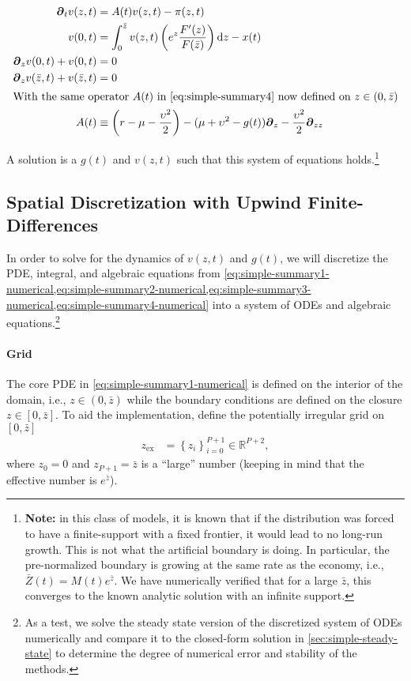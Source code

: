 \documentclass[11pt]{article}
\newcommand{\D}[1][]{\ensuremath{\boldsymbol{\partial}_{#1}}}
\newcommand{\R}{\ensuremath{\mathbb{R}}}
\newcommand{\diff}{\ensuremath{\mathrm{d}}}
\newcommand{\ex}{\ensuremath{\mathrm{ex}}}
\newcommand{\set}[1]{\ensuremath{\left\{{#1}\right\}}}
\begin{document}
\begin{align}
\D[t]v(z,t) &= A(t)v(z,t) - \pi(z,t)\label{eq:simple-summary1-numerical}\\
v(0,t) &= \int_{0}^{\bar{z}}  v(z,t) \left(e^z \frac{F'(z)}{F(\bar{z})}\right) \diff z - x(t)\label{eq:simple-summary2-numerical}\\
\D[z]v(0,t) + v(0,t) &= 0\label{eq:simple-summary3-numerical}\\
\D[z]v(\bar{z},t) + v(\bar{z},t) &= 0\label{eq:simple-summary4-numerical}\\
\intertext{With the same operator $A(t)$ in \cref{eq:simple-summary4} now defined on $z \in (0,\bar{z})$}
A(t) &\equiv \left(r - \mu - \frac{\upsilon^2}{2}\right) - (\mu+ \upsilon^2 - g(t)) \D[z] - \frac{\upsilon^2}{2} \D[zz]\label{eq:simple-summary5-numerical}
\end{align}

\noindent A solution is a $g(t)$ and $v(z,t)$ such that this system of equations holds.\footnote{\textbf{Note:} in this class of models, it is known that if the distribution was forced to have a finite-support with a fixed frontier, it would lead to no long-run growth.  This is not what the artificial boundary is doing.  In particular, the pre-normalized boundary is growing at the same rate as the economy, i.e., $\bar{Z}(t) = M(t) e^{\bar{z}}$.  We have numerically verified that for a large $\bar{z}$, this converges to the known analytic solution with an infinite support.}

\subsection{Spatial Discretization with Upwind Finite-Differences}

In order to solve for the dynamics of $v(z,t)$ and $g(t)$, we will discretize the PDE, integral, and algebraic equations from \cref{eq:simple-summary1-numerical,eq:simple-summary2-numerical,eq:simple-summary3-numerical,eq:simple-summary4-numerical} into a system of ODEs and algebraic equations.\footnote{As a test, we solve the steady state version of the discretized system of ODEs numerically and compare it to the closed-form solution in \cref{sec:simple-steady-state} to determine the degree of numerical error and stability of the methods.}


\paragraph{Grid}
The core PDE in \cref{eq:simple-summary1-numerical} is defined on the interior of the domain, i.e., $z \in (0, \bar{z})$ while the boundary conditions are defined on the closure $z \in [0,\bar{z}]$.  To aid the implementation, define the potentially irregular grid on $[0,\bar{z}]$
\begin{align}
	z_{\ex} &= \set{z_i}_{i=0}^{P+1} \in \R^{P+2},
\end{align}
where $z_0 = 0$ and $z_{P+1} = \bar{z}$ is a ``large'' number (keeping in mind that the effective number is $e^{\bar{z}}$).
\end{document}
